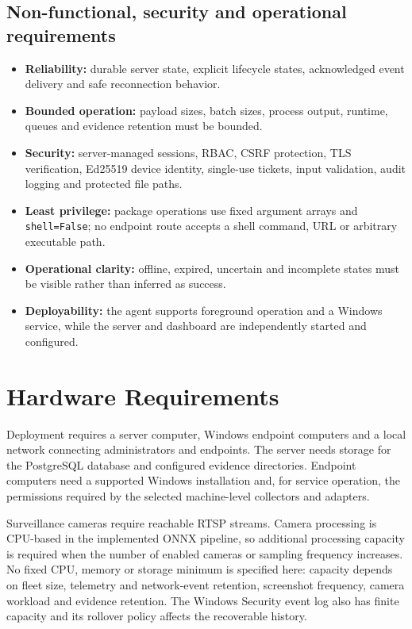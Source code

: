 \documentclass[12pt,a4paper]{report}
\begin{document}
\subsection{Non-functional, security and operational requirements}
\begin{itemize}
\item \textbf{Reliability:} durable server state, explicit lifecycle states,
acknowledged event delivery and safe reconnection behavior.
\item \textbf{Bounded operation:} payload sizes, batch sizes, process output,
runtime, queues and evidence retention must be bounded.
\item \textbf{Security:} server-managed sessions, RBAC, CSRF protection,
TLS verification, Ed25519 device identity, single-use tickets, input
validation, audit logging and protected file paths.
\item \textbf{Least privilege:} package operations use fixed argument arrays
and \texttt{shell=False}; no endpoint route accepts a shell command, URL or
arbitrary executable path.
\item \textbf{Operational clarity:} offline, expired, uncertain and
incomplete states must be visible rather than inferred as success.
\item \textbf{Deployability:} the agent supports foreground operation and a
Windows service, while the server and dashboard are independently started and
configured.
\end{itemize}

\section{Hardware Requirements}
Deployment requires a server computer, Windows endpoint computers and a local
network connecting administrators and endpoints. The server needs storage for
the PostgreSQL database and configured evidence directories. Endpoint computers
need a supported Windows installation and, for service operation, the
permissions required by the selected machine-level collectors and adapters.

Surveillance cameras require reachable RTSP streams. Camera processing is
CPU-based in the implemented ONNX pipeline, so additional processing capacity
is required when the number of enabled cameras or sampling frequency increases.
No fixed CPU, memory or storage minimum is specified here: capacity depends on
fleet size, telemetry and network-event retention, screenshot frequency,
camera workload and evidence retention. The Windows Security event log also
has finite capacity and its rollover policy affects the recoverable history.
\end{document}
